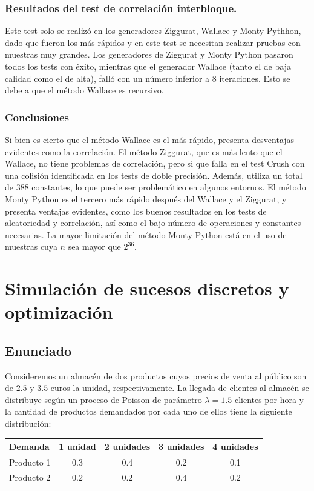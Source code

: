 \documentclass[a4paper,12pt]{article}
\begin{document}
	\subsubsection{Resultados del test de correlación interbloque.}
	Este test solo se realizó en los generadores Ziggurat, Wallace y Monty Pythhon, dado que fueron los más rápidos y en este test se necesitan realizar pruebas con muestras muy grandes. Los generadores de Ziggurat y Monty Python pasaron todos los tests con éxito, mientras que el generador Wallace (tanto el de baja calidad como el de alta), falló con un número inferior a $8$ iteraciones. Esto se debe a que el método Wallace es recursivo.
	
	\subsubsection{Conclusiones}
	Si bien es cierto que el método Wallace es el más rápido, presenta desventajas evidentes como la correlación. 
	El método Ziggurat, que es más lento que el Wallace, no tiene problemas de correlación, pero si que falla en el test Crush con una colisión identificada en los tests de doble precisión. 
	Además, utiliza un total de $388$ constantes, lo que puede ser problemático en algunos entornos. 
	El método Monty Python es el tercero más rápido después del Wallace y el Ziggurat, y presenta ventajas evidentes, como los buenos resultados en los tests de aleatoriedad y correlación, así como el bajo número de operaciones y constantes necesarias. 
	La mayor limitación del método Monty Python está en el uso de muestras cuya $n$ sea mayor que $2^{36}$. 
	
	
	\newpage

	\section{Simulación de sucesos discretos y optimización}

	\subsection{Enunciado}
	Consideremos un almacén de dos productos cuyos precios de venta al público son de $2.5$ y $3.5$ euros la unidad, respectivamente. La llegada de clientes al almacén se distribuye según un proceso de Poisson de parámetro $\lambda = 1.5$ clientes por hora y la cantidad de productos demandados por cada uno de ellos tiene la siguiente distribución:

	\begin{table}[H]
		\centering
		\begin{tabular}{|l||c|c|c|c|}
			\hline
			Demanda    & 1 unidad & 2 unidades & 3 unidades & 4 unidades \\ \hline \hline
			Producto 1 & 0.3      & 0.4        & 0.2        & 0.1        \\ \hline
			Producto 2 & 0.2      & 0.2        & 0.4        & 0.2        \\ \hline
		\end{tabular}
	\end{table}
	
\end{document}
